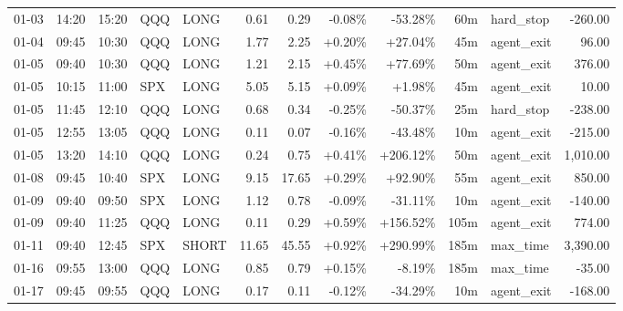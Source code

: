 \documentclass[11pt,a4paper,twoside]{article}
\begin{document}
\begin{center}
\begin{longtable}{>{\color{txtmain}}l l l l l r r r r r >{\color{txtmain}}l r}
01-03 & 14:20 & 15:20 & QQQ & LONG & 0.61 & 0.29 & \textcolor{lossred}{-0.08\%} & \textcolor{lossred}{-53.28\%} & 60m & hard\_stop & \textcolor{lossred}{-260.00} \\
01-04 & 09:45 & 10:30 & QQQ & LONG & 1.77 & 2.25 & \textcolor{wingreen}{+0.20\%} & \textcolor{wingreen}{+27.04\%} & 45m & agent\_exit & \textcolor{wingreen}{96.00} \\
01-05 & 09:40 & 10:30 & QQQ & LONG & 1.21 & 2.15 & \textcolor{wingreen}{+0.45\%} & \textcolor{wingreen}{+77.69\%} & 50m & agent\_exit & \textcolor{wingreen}{376.00} \\
01-05 & 10:15 & 11:00 & SPX & LONG & 5.05 & 5.15 & \textcolor{wingreen}{+0.09\%} & \textcolor{wingreen}{+1.98\%} & 45m & agent\_exit & \textcolor{wingreen}{10.00} \\
01-05 & 11:45 & 12:10 & QQQ & LONG & 0.68 & 0.34 & \textcolor{lossred}{-0.25\%} & \textcolor{lossred}{-50.37\%} & 25m & hard\_stop & \textcolor{lossred}{-238.00} \\
01-05 & 12:55 & 13:05 & QQQ & LONG & 0.11 & 0.07 & \textcolor{lossred}{-0.16\%} & \textcolor{lossred}{-43.48\%} & 10m & agent\_exit & \textcolor{lossred}{-215.00} \\
01-05 & 13:20 & 14:10 & QQQ & LONG & 0.24 & 0.75 & \textcolor{wingreen}{+0.41\%} & \textcolor{wingreen}{+206.12\%} & 50m & agent\_exit & \textcolor{wingreen}{1,010.00} \\
01-08 & 09:45 & 10:40 & SPX & LONG & 9.15 & 17.65 & \textcolor{wingreen}{+0.29\%} & \textcolor{wingreen}{+92.90\%} & 55m & agent\_exit & \textcolor{wingreen}{850.00} \\
01-09 & 09:40 & 09:50 & SPX & LONG & 1.12 & 0.78 & \textcolor{lossred}{-0.09\%} & \textcolor{lossred}{-31.11\%} & 10m & agent\_exit & \textcolor{lossred}{-140.00} \\
01-09 & 09:40 & 11:25 & QQQ & LONG & 0.11 & 0.29 & \textcolor{wingreen}{+0.59\%} & \textcolor{wingreen}{+156.52\%} & 105m & agent\_exit & \textcolor{wingreen}{774.00} \\
01-11 & 09:40 & 12:45 & SPX & SHORT & 11.65 & 45.55 & \textcolor{wingreen}{+0.92\%} & \textcolor{wingreen}{+290.99\%} & 185m & max\_time & \textcolor{wingreen}{3,390.00} \\
01-16 & 09:55 & 13:00 & QQQ & LONG & 0.85 & 0.79 & \textcolor{wingreen}{+0.15\%} & \textcolor{lossred}{-8.19\%} & 185m & max\_time & \textcolor{lossred}{-35.00} \\
01-17 & 09:45 & 09:55 & QQQ & LONG & 0.17 & 0.11 & \textcolor{lossred}{-0.12\%} & \textcolor{lossred}{-34.29\%} & 10m & agent\_exit & \textcolor{lossred}{-168.00} \\

\end{longtable}
\end{center}
\end{document}
